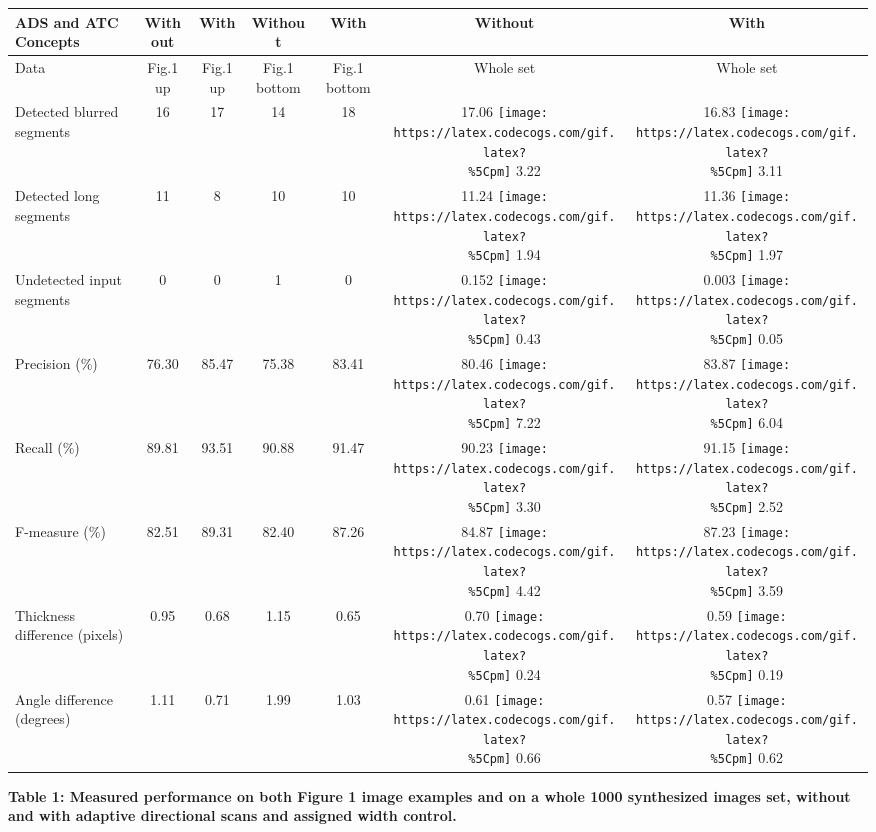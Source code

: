 \begin{longtable}[]{@{}lcccccc@{}}
\toprule
ADS and ATC Concepts & Without & With & Without & With & Without &
With\tabularnewline
\midrule
\endhead
Data & Fig.1 up & Fig.1 up & Fig.1 bottom & Fig.1 bottom & Whole set &
Whole set\tabularnewline
Detected blurred segments & 16 & 17 & 14 & 18 & 17.06
\texttt{[image: https://latex.codecogs.com/gif.latex?\\\%5Cpm]} 3.22 &
16.83 \texttt{[image: https://latex.codecogs.com/gif.latex?\\\%5Cpm]}
3.11\tabularnewline
Detected long segments & 11 & 8 & 10 & 10 & 11.24
\texttt{[image: https://latex.codecogs.com/gif.latex?\\\%5Cpm]} 1.94 &
11.36 \texttt{[image: https://latex.codecogs.com/gif.latex?\\\%5Cpm]}
1.97\tabularnewline
Undetected input segments & 0 & 0 & 1 & 0 & 0.152
\texttt{[image: https://latex.codecogs.com/gif.latex?\\\%5Cpm]} 0.43 &
0.003 \texttt{[image: https://latex.codecogs.com/gif.latex?\\\%5Cpm]}
0.05\tabularnewline
Precision (\%) & 76.30 & 85.47 & 75.38 & 83.41 & 80.46
\texttt{[image: https://latex.codecogs.com/gif.latex?\\\%5Cpm]} 7.22 &
83.87 \texttt{[image: https://latex.codecogs.com/gif.latex?\\\%5Cpm]}
6.04\tabularnewline
Recall (\%) & 89.81 & 93.51 & 90.88 & 91.47 & 90.23
\texttt{[image: https://latex.codecogs.com/gif.latex?\\\%5Cpm]} 3.30 &
91.15 \texttt{[image: https://latex.codecogs.com/gif.latex?\\\%5Cpm]}
2.52\tabularnewline
F-measure (\%) & 82.51 & 89.31 & 82.40 & 87.26 & 84.87
\texttt{[image: https://latex.codecogs.com/gif.latex?\\\%5Cpm]} 4.42 &
87.23 \texttt{[image: https://latex.codecogs.com/gif.latex?\\\%5Cpm]}
3.59\tabularnewline
Thickness difference (pixels) & 0.95 & 0.68 & 1.15 & 0.65 & 0.70
\texttt{[image: https://latex.codecogs.com/gif.latex?\\\%5Cpm]} 0.24 &
0.59 \texttt{[image: https://latex.codecogs.com/gif.latex?\\\%5Cpm]}
0.19\tabularnewline
Angle difference (degrees) & 1.11 & 0.71 & 1.99 & 1.03 & 0.61
\texttt{[image: https://latex.codecogs.com/gif.latex?\\\%5Cpm]} 0.66 &
0.57 \texttt{[image: https://latex.codecogs.com/gif.latex?\\\%5Cpm]}
0.62\tabularnewline
\bottomrule
\end{longtable}

\textbf{Table 1: Measured performance on both Figure 1 image examples
and on a whole 1000 synthesized images set, without and with adaptive
directional scans and assigned width control.}
